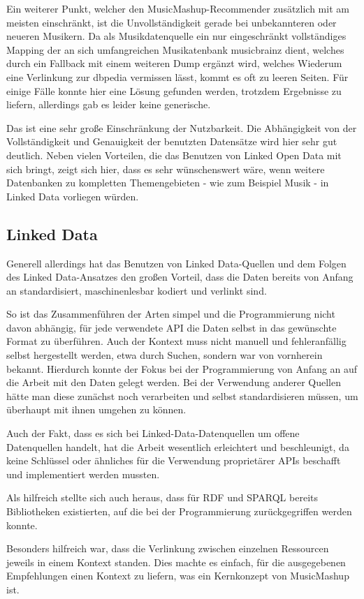 Ein weiterer Punkt, welcher den MusicMashup-Recommender zusätzlich mit am meisten einschränkt, ist die Unvollständigkeit gerade bei unbekannteren oder neueren Musikern. Da als Musikdatenquelle ein nur eingeschränkt vollständiges Mapping der an sich umfangreichen Musikatenbank musicbrainz dient, welches durch ein Fallback mit einem weiteren Dump ergänzt wird, welches Wiederum eine Verlinkung zur dbpedia vermissen lässt, kommt es oft zu leeren Seiten. Für einige Fälle konnte hier eine Lösung gefunden werden, trotzdem Ergebnisse zu liefern, allerdings gab es leider keine generische.

Das ist eine sehr große Einschränkung der Nutzbarkeit. Die Abhängigkeit von der Vollständigkeit und Genauigkeit der benutzten Datensätze wird hier sehr gut deutlich. Neben vielen Vorteilen, die das Benutzen von Linked Open Data mit sich bringt, zeigt sich hier, dass es sehr wünschenswert wäre, wenn weitere Datenbanken zu kompletten Themengebieten - wie zum Beispiel Musik - in Linked Data vorliegen würden.

\subsection{Linked Data}

Generell allerdings hat das Benutzen von Linked Data-Quellen und dem Folgen des Linked Data-Ansatzes den großen Vorteil, dass die Daten bereits von Anfang an standardisiert, maschinenlesbar kodiert und verlinkt sind.

So ist das Zusammenführen der Arten simpel und die Programmierung nicht davon abhängig, für jede verwendete API die Daten selbst in das gewünschte Format zu überführen. Auch der Kontext muss nicht manuell und fehleranfällig selbst hergestellt werden, etwa durch Suchen, sondern war von vornherein bekannt. Hierdurch konnte der Fokus bei der Programmierung von Anfang an auf die Arbeit mit den Daten gelegt werden. Bei der Verwendung anderer Quellen hätte man diese zunächst noch verarbeiten und selbst standardisieren müssen, um überhaupt mit ihnen umgehen zu können.

Auch der Fakt, dass es sich bei Linked-Data-Datenquellen um  offene Datenquellen handelt, hat die Arbeit wesentlich erleichtert und beschleunigt, da keine Schlüssel oder ähnliches für die Verwendung proprietärer APIs beschafft und implementiert werden mussten. 

Als hilfreich stellte sich auch heraus, dass für RDF und SPARQL bereits Bibliotheken existierten, auf die bei der Programmierung zurückgegriffen werden konnte.

Besonders hilfreich war, dass die Verlinkung zwischen einzelnen Ressourcen jeweils in einem Kontext standen. Dies machte es einfach, für die ausgegebenen Empfehlungen einen Kontext zu liefern, was ein Kernkonzept von MusicMashup ist.